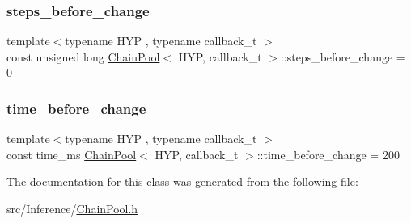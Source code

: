\mbox{\label{class_chain_pool_a143f3e4f9b60c03c67ffbc2db3e57d53}} 
\subsubsection{\texorpdfstring{steps\+\_\+before\+\_\+change}{steps\_before\_change}}
{\footnotesize\ttfamily template$<$typename H\+YP , typename callback\+\_\+t $>$ \\
const unsigned long \hyperlink{class_chain_pool}{Chain\+Pool}$<$ H\+YP, callback\+\_\+t $>$\+::steps\+\_\+before\+\_\+change = 0\hspace{0.3cm}{\ttfamily [static]}}

\mbox{\label{class_chain_pool_a1ff48aa1e09a9a31871dec05d3c0e9d3}} 
\subsubsection{\texorpdfstring{time\+\_\+before\+\_\+change}{time\_before\_change}}
{\footnotesize\ttfamily template$<$typename H\+YP , typename callback\+\_\+t $>$ \\
const time\+\_\+ms \hyperlink{class_chain_pool}{Chain\+Pool}$<$ H\+YP, callback\+\_\+t $>$\+::time\+\_\+before\+\_\+change = 200\hspace{0.3cm}{\ttfamily [static]}}



The documentation for this class was generated from the following file\+:\begin{DoxyCompactItemize}
\item 
src/\+Inference/\hyperlink{_chain_pool_8h}{Chain\+Pool.\+h}\end{DoxyCompactItemize}
